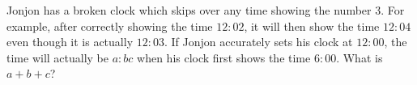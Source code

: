 Jonjon has a broken clock which skips over any time showing the number $3$. For example, after correctly showing the time $12:02$, it will then show the time $12:04$ even though it is actually $12:03$. If Jonjon accurately sets his clock at $12:00$, the time will actually be $a:bc$ when his clock first shows the time $6:00$. What is $a+b+c$?
